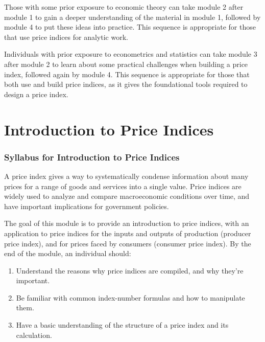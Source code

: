 \documentclass[]{article}
\begin{document}
Those with some prior exposure to economic theory can take module 2 after module 1 to gain a deeper understanding of the material in module 1, followed by module 4 to put these ideas into practice. This sequence is appropriate for those that use price indices for analytic work.

Individuals with prior exposure to econometrics and statistics can take module 3 after module 2 to learn about some practical challenges when building a price index, followed again by module 4. This sequence is appropriate for those that both use and build price indices, as it gives the foundational tools required to design a price index.

\hypertarget{part-introduction-to-price-indices}{%
\part{Introduction to Price Indices}\label{part-introduction-to-price-indices}}

\hypertarget{syllabus-for-introduction-to-price-indices}{%
\section{Syllabus for Introduction to Price Indices}\label{syllabus-for-introduction-to-price-indices}}

A price index gives a way to systematically condense information about many prices for a range of goods and services into a single value. Price indices are widely used to analyze and compare macroeconomic conditions over time, and have important implications for government policies.

The goal of this module is to provide an introduction to price indices, with an application to price indices for the inputs and outputs of production (producer price index), and for prices faced by consumers (consumer price index). By the end of the module, an individual should:

\begin{enumerate}
\def\labelenumi{\arabic{enumi}.}
\item
  Understand the reasons why price indices are compiled, and why they're important.
\item
  Be familiar with common index-number formulas and how to manipulate them.
\item
  Have a basic understanding of the structure of a price index and its calculation.
\end{enumerate}
\end{document}
